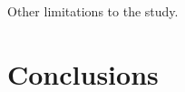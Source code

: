 \documentclass[conference]{IEEEtran}
\begin{document}
Other limitations to the study.

\section{Conclusions}



%
%



%
%
\end{document}
